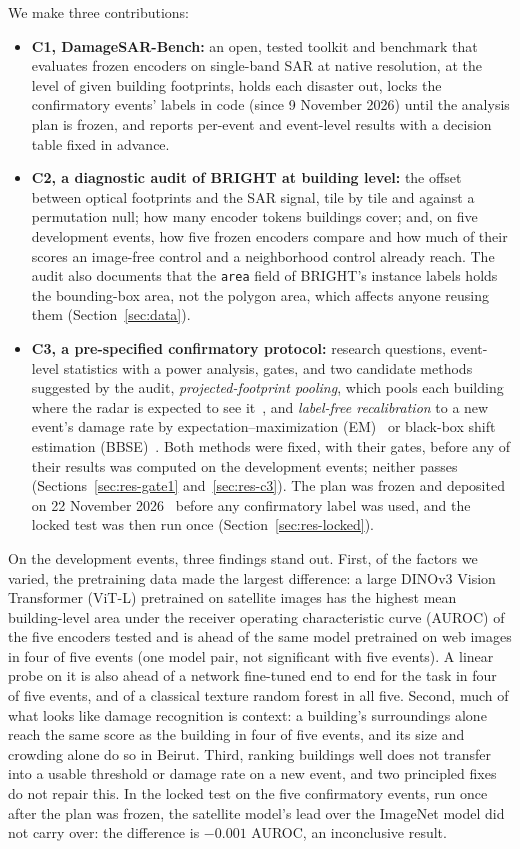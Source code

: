 \documentclass[journal]{IEEEtran}
\begin{document}
We make three contributions:
\begin{itemize}
\item \textbf{C1, DamageSAR-Bench:} an open, tested toolkit and benchmark that evaluates frozen encoders on single-band SAR at native resolution, at the level of given building footprints, holds each disaster out, locks the confirmatory events' labels in code (since 9 November 2026) until the analysis plan is frozen, and reports per-event and event-level results with a decision table fixed in advance.
\item \textbf{C2, a diagnostic audit of BRIGHT at building level:} the offset between optical footprints and the SAR signal, tile by tile and against a permutation null; how many encoder tokens buildings cover; and, on five development events, how five frozen encoders compare and how much of their scores an image-free control and a neighborhood control already reach. The audit also documents that the \texttt{area} field of BRIGHT's instance labels holds the bounding-box area, not the polygon area, which affects anyone reusing them (Section~\ref{sec:data}).
\item \textbf{C3, a pre-specified confirmatory protocol:} research questions, event-level statistics with a power analysis, gates, and two candidate methods suggested by the audit, \emph{projected-footprint pooling}, which pools each building where the radar is expected to see it~\cite{liu2014height,brunner2010earthquake}, and \emph{label-free recalibration} to a new event's damage rate by expectation--maximization (EM)~\cite{saerens2002adjusting} or black-box shift estimation (BBSE)~\cite{lipton2018bbse}. Both methods were fixed, with their gates, before any of their results was computed on the development events; neither passes (Sections~\ref{sec:res-gate1} and~\ref{sec:res-c3}). The plan was frozen and deposited on 22 November 2026~\cite{lehan2026prereg} before any confirmatory label was used, and the locked test was then run once (Section~\ref{sec:res-locked}).
\end{itemize}

On the development events, three findings stand out. First, of the factors we varied, the pretraining data made the largest difference: a large DINOv3 Vision Transformer (ViT-L) pretrained on satellite images has the highest mean building-level area under the receiver operating characteristic curve (AUROC) of the five encoders tested and is ahead of the same model pretrained on web images in four of five events (one model pair, not significant with five events). A linear probe on it is also ahead of a network fine-tuned end to end for the task in four of five events, and of a classical texture random forest in all five. Second, much of what looks like damage recognition is context: a building's surroundings alone reach the same score as the building in four of five events, and its size and crowding alone do so in Beirut. Third, ranking buildings well does not transfer into a usable threshold or damage rate on a new event, and two principled fixes do not repair this. In the locked test on the five confirmatory events, run once after the plan was frozen, the satellite model's lead over the ImageNet model did not carry over: the difference is $-0.001$ AUROC, an inconclusive result.
\end{document}
